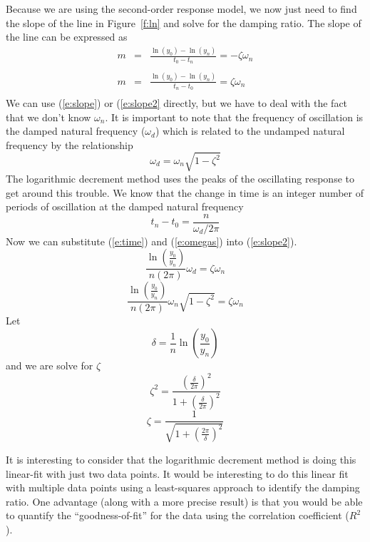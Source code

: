 Because we are using the second-order response model, we now just need to find the slope of the line in Figure~\ref{f:ln} and solve for the damping ratio.  The slope of the line can be expressed as
\begin{eqnarray}
m & = & \frac{\ln(y_0)-\ln(y_n)}{t_0-t_n}=-\zeta \omega_n \\
\label{e:slope} \\
m & = & \frac{\ln(y_0)-\ln(y_n)}{t_n-t_0}=\zeta \omega_n \\
\label{e:slope2}
\end{eqnarray}
We can use (\ref{e:slope}) or (\ref{e:slope2} directly, but we have to deal with the fact that we don't know $\omega_n$.  It is important to note that the frequency of oscillation is the damped natural frequency ($\omega_d$) which is related to the undamped natural frequency by the relationship
\begin{equation}
\omega_d=\omega_n\sqrt{1-\zeta^2}
\label{e:omegas}
\end{equation}
The logarithmic decrement method uses the peaks of the oscillating response to get around this trouble.  We know that the change in time is an integer number of periods of oscillation at the damped natural frequency
\begin{equation}
t_n-t_0 = \frac{n}{\omega_d / 2 \pi}
\label{e:time}
\end{equation}
Now we can substitute (\ref{e:time}) and (\ref{e:omegas}) into (\ref{e:slope2}).
\[
\frac{\ln\left(\frac{y_0}{y_n}\right)}{n (2 \pi)} \omega_d = \zeta \omega_n
\]
\[
\frac{\ln\left(\frac{y_0}{y_n}\right)}{n (2 \pi)} \omega_n \sqrt{1-\zeta^2} = \zeta \omega_n
\]
Let 
\[ \delta = \frac{1}{n}\ln\left(\frac{y_0}{y_n}\right) \]
and we are solve for $\zeta$
\[
\zeta^2=\frac{\left(\frac{\delta}{2 \pi}\right)^2}{1+\left(\frac{\delta}{2 \pi}\right)^2}
\]
\[ \zeta = \frac{1}{\sqrt{1+\left(\frac{2\pi}{\delta}\right)^2}} \]

It is interesting to consider that the logarithmic decrement method is doing this linear-fit with just two data points.  It would be interesting to do this linear fit with multiple data points using a least-squares approach to identify the damping ratio.  One advantage (along with a more precise result) is that you would be able to quantify the ``goodness-of-fit'' for the data using the correlation coefficient ($R^2$).




